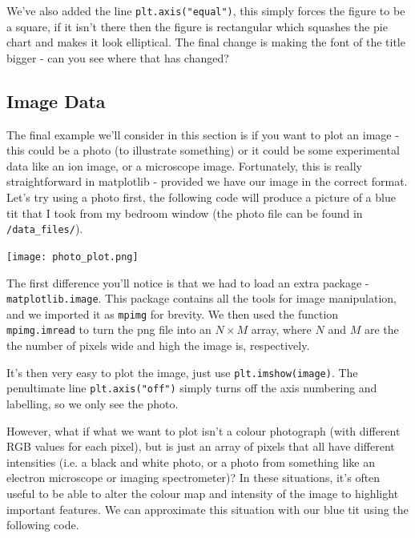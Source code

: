 \documentclass[10pt,a4paper]{memoir}
\begin{document}
We've also added the line \texttt{plt.axis("equal")}, this simply forces the figure to be a square, if it isn't there then the figure is rectangular which squashes the pie chart and makes it look elliptical. The final change is making the font of the title bigger - can you see where that has changed?
\newpage

\subsection{Image Data}
The final example we'll consider in this section is if you want to plot an image - this could be a photo (to illustrate something) or it could be some experimental data like an ion image, or a microscope image. Fortunately, this is really straightforward in matplotlib - provided we have our image in the correct format. Let's try using a photo first, the following code will produce a picture of a blue tit that I took from my bedroom window (the photo file can be found in \texttt{/data\_files/}).

\begin{minipage}{0.48\textwidth}
\end{minipage}
\quad
\begin{minipage}{0.48\textwidth}
		\centering
		\texttt{[image: photo\_plot.png]}
\end{minipage}

The first difference you'll notice is that we had to load an extra package - \texttt{matplotlib.image}. This package contains all the tools for image manipulation, and we imported it as \texttt{mpimg} for brevity. We then used the function \texttt{mpimg.imread} to turn the png file into an $N\times M$ array, where $N$ and $M$ are the the number of pixels wide and high the image is, respectively. 

It's then very easy to plot the image, just use \texttt{plt.imshow(image)}. The penultimate line \texttt{plt.axis("off")} simply turns off the axis numbering and labelling, so we only see the photo.

However, what if what we want to plot isn't a colour photograph (with different RGB values for each pixel), but is just an array of pixels that all have different intensities (i.e. a black and white photo, or a photo from something like an electron microscope or imaging spectrometer)? In these situations, it's often useful to be able to alter the colour map and intensity of the image to highlight important features. We can approximate this situation with our blue tit using the following code. 
\end{document}
